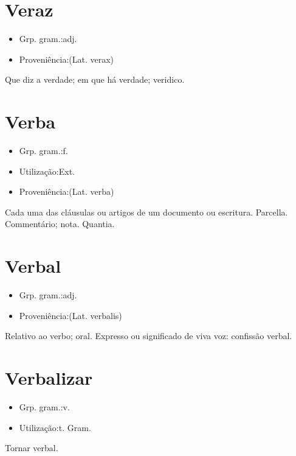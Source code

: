 \documentclass{article}
\begin{document}
\section{Veraz}
\begin{itemize}
\item {Grp. gram.:adj.}
\end{itemize}
\begin{itemize}
\item {Proveniência:(Lat. \textunderscore verax\textunderscore )}
\end{itemize}
Que diz a verdade; em que há verdade; veridico.
\section{Verba}
\begin{itemize}
\item {Grp. gram.:f.}
\end{itemize}
\begin{itemize}
\item {Utilização:Ext.}
\end{itemize}
\begin{itemize}
\item {Proveniência:(Lat. \textunderscore verba\textunderscore )}
\end{itemize}
Cada uma das cláusulas ou artigos de um documento ou escritura.
Parcella.
Commentário; nota.
Quantia.
\section{Verbal}
\begin{itemize}
\item {Grp. gram.:adj.}
\end{itemize}
\begin{itemize}
\item {Proveniência:(Lat. \textunderscore verbalis\textunderscore )}
\end{itemize}
Relativo ao verbo; oral.
Expresso ou significado de viva voz: \textunderscore confissão verbal\textunderscore .
\section{Verbalizar}
\begin{itemize}
\item {Grp. gram.:v.}
\end{itemize}
\begin{itemize}
\item {Utilização:t. Gram.}
\end{itemize}
Tornar verbal.
\end{document}
